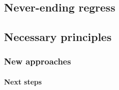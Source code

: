 \begin{subappendices}

	
	\section{Never-ending regress}\label{sec:1A_abc}
		
		
		\subsection{Necessary principles}\label{subsec:1A_def}

			\kant[13]
		
			\subsubsection{New approaches}\label{subsubsec:1A_ghi}

				\kant[13]
		
				\paragraph{Next steps}\label{par:1A_jkl}

					\kant[2]
					\clearpage
					
					\AddToShipoutPicture*{\ShowFramePicture}
					\kant[36]
					\AddToShipoutPicture*{\ShowFramePicture}
					\kant[37]
					\AddToShipoutPicture*{\ShowFramePicture}
					\kant[38]
					\AddToShipoutPicture*{\ShowFramePicture}
					\kant[39]
					\AddToShipoutPicture*{\ShowFramePicture}
					\kant[40]
					\AddToShipoutPicture*{\ShowFramePicture}
					\kant[41]
					\AddToShipoutPicture*{\ShowFramePicture}
					\kant[42]
					\AddToShipoutPicture*{\ShowFramePicture}
					\kant[43]
					\AddToShipoutPicture*{\ShowFramePicture}
					\kant[44]
					\AddToShipoutPicture*{\ShowFramePicture}
					\kant[45]
					\AddToShipoutPicture*{\ShowFramePicture}
					\kant[46]
					\AddToShipoutPicture*{\ShowFramePicture}
					\kant[13]
			
\end{subappendices}

